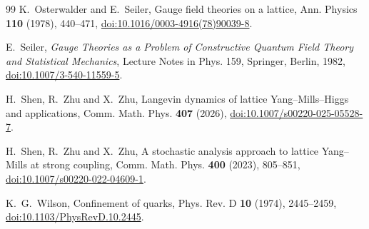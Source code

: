 \documentclass[11pt]{amsart}
\theoremstyle{definition}
\theoremstyle{remark}
\begin{document}
\begin{thebibliography}{99}
K.~Osterwalder and E.~Seiler, Gauge field theories on a lattice, Ann. Physics
\textbf{110} (1978), 440--471,
\href{https://doi.org/10.1016/0003-4916(78)90039-8}{doi:10.1016/0003-4916(78)90039-8}.

E.~Seiler, \emph{Gauge Theories as a Problem of Constructive Quantum Field
Theory and Statistical Mechanics}, Lecture Notes in Phys. 159, Springer,
Berlin, 1982, \href{https://doi.org/10.1007/3-540-11559-5}{doi:10.1007/3-540-11559-5}.

H.~Shen, R.~Zhu and X.~Zhu, Langevin dynamics of lattice Yang--Mills--Higgs and
applications, Comm. Math. Phys. \textbf{407} (2026),
\href{https://doi.org/10.1007/s00220-025-05528-7}{doi:10.1007/s00220-025-05528-7}.

H.~Shen, R.~Zhu and X.~Zhu, A stochastic analysis approach to lattice
Yang--Mills at strong coupling, Comm. Math. Phys. \textbf{400} (2023),
805--851, \href{https://doi.org/10.1007/s00220-022-04609-1}{doi:10.1007/s00220-022-04609-1}.

K.~G.~Wilson, Confinement of quarks, Phys. Rev. D \textbf{10} (1974),
2445--2459, \href{https://doi.org/10.1103/PhysRevD.10.2445}{doi:10.1103/PhysRevD.10.2445}.

\end{thebibliography}
\end{document}
